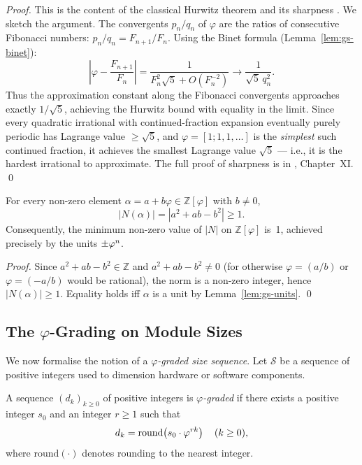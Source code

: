 \begin{proof}
This is the content of the classical Hurwitz theorem and its sharpness
\cite{hardy_wright}.  We sketch the argument.  The convergents
\(p_n/q_n\) of \(\varphi\) are the ratios of consecutive Fibonacci
numbers: \(p_n/q_n = F_{n+1}/F_n\).  Using the Binet formula
(Lemma~\ref{lem:gs-binet}):
\[
  \left|\varphi - \frac{F_{n+1}}{F_n}\right|
  = \frac{1}{F_n^2 \sqrt{5} + O(F_n^{-2})} \to \frac{1}{\sqrt{5}\,q_n^2} .
\]
Thus the approximation constant along the Fibonacci convergents
approaches exactly \(1/\sqrt{5}\), achieving the Hurwitz bound with
equality in the limit.  Since every quadratic irrational with
continued-fraction expansion eventually purely periodic has Lagrange
value \(\ge \sqrt{5}\), and \(\varphi = [1;1,1,\ldots]\) is the
\emph{simplest} such continued fraction, it achieves the smallest
Lagrange value \(\sqrt{5}\) — i.e., it is the hardest irrational to
approximate.  The full proof of sharpness is in \cite{hardy_wright},
Chapter~XI.
\qed
\end{proof}

\begin{corollary}\label{cor:gs-mingap}
For every non-zero element \(\alpha = a + b\varphi \in \mathbb{Z}[\varphi]\)
with \(b \ne 0\),
\[
  |N(\alpha)| = |a^2 + ab - b^2| \ge 1 .
\]
Consequently, the minimum non-zero value of \(|N|\) on
\(\mathbb{Z}[\varphi]\) is~1, achieved precisely by the units
\(\pm\varphi^{n}\).
\end{corollary}

\begin{proof}
Since \(a^2 + ab - b^2 \in \mathbb{Z}\) and \(a^2+ab-b^2 \ne 0\)
(for otherwise \(\varphi = (a/b)\) or \(\varphi = (-a/b)\) would be
rational), the norm is a non-zero integer, hence
\(|N(\alpha)| \ge 1\).  Equality holds iff \(\alpha\) is a unit by
Lemma~\ref{lem:gs-units}.
\qed
\end{proof}

\subsection{The \(\varphi\)-Grading on Module Sizes}
\label{subsec:gs-grading}

We now formalise the notion of a \emph{\(\varphi\)-graded size
sequence}.  Let \(\mathcal{S}\) be a sequence of positive integers
used to dimension hardware or software components.

\begin{definition}\label{def:gs-graded}
A sequence \((d_k)_{k \ge 0}\) of positive integers is
\emph{\(\varphi\)-graded} if there exists a positive integer \(s_0\)
and an integer \(r \ge 1\) such that
\[
  d_k = \text{round}\!\left( s_0 \cdot \varphi^{rk} \right) \quad (k \ge 0) ,
\]
where \(\text{round}(\cdot)\) denotes rounding to the nearest integer.
\end{definition}

